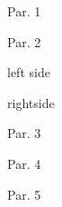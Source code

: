 \documentclass[b5paper]{book}
\begin{document}
\beginnumbering
\numberpstarttrue
\pstart
Par. 1
\pend

\pstart
Par. 2
\pend

\pausenumbering
\begin{pairs}
\begin{Leftside}
\numberpstartfalse
\resumenumbering
	\pstart\noindent left side\pend
\pausenumbering
\end{Leftside}

\begin{Rightside}
\numberpstartfalse
\beginnumbering
	\pstart\noindent rightside\pend
\pausenumbering
\end{Rightside}
\end{pairs}
\Columns

\numberpstarttrue
\resumenumbering

\pstart
Par. 3
\pend


\pstart
Par. 4
\pend

\pstart
Par. 5
\pend

\endnumbering
\end{document}
